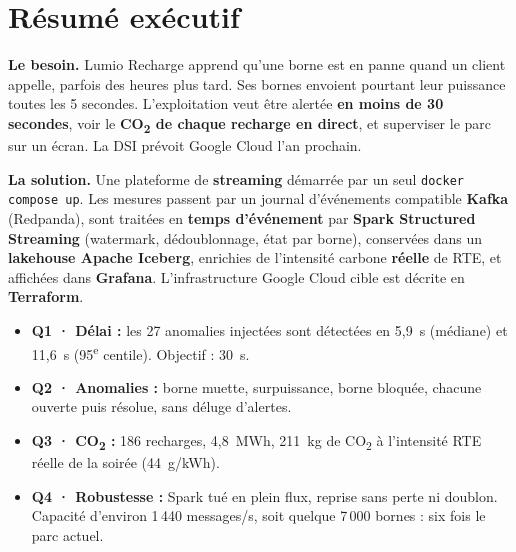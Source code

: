 \documentclass[11pt, a4paper, oneside, headings=normal, numbers=noenddot, DIV=12]{scrartcl}
\begin{document}
\begingroup
{}
\setcounter{tocdepth}{2}
\tableofcontents
\endgroup
\clearpage

\section{Résumé exécutif}\label{sec:resume}

\textbf{Le besoin.} Lumio Recharge apprend qu'une borne est en panne quand un client appelle, parfois des heures plus tard. Ses bornes envoient
pourtant leur puissance toutes les 5 secondes. L'exploitation veut être alertée \textbf{en moins de 30 secondes}, voir le \textbf{CO\textsubscript{2}
de chaque recharge en direct}, et superviser le parc sur un écran. La DSI prévoit Google Cloud l'an prochain.

\textbf{La solution.} Une plateforme de \textbf{streaming} démarrée par un seul \texttt{docker compose up}. Les mesures passent par un journal
d'événements compatible \textbf{Kafka} (Redpanda), sont traitées en \textbf{temps d'événement} par \textbf{Spark Structured Streaming}
(watermark, dédoublonnage, état par borne), conservées dans un \textbf{lakehouse Apache Iceberg}, enrichies de l'intensité carbone
\textbf{réelle} de RTE, et affichées dans \textbf{Grafana}. L'infrastructure Google Cloud cible est décrite en \textbf{Terraform}.


\begin{keybox}
\begin{itemize}[leftmargin=1.2em]
  \item \textbf{Q1 · Délai :} les 27 anomalies injectées sont détectées en 5,9~s (médiane) et 11,6~s (95\textsuperscript{e} centile). Objectif : 30~s.
  \item \textbf{Q2 · Anomalies :} borne muette, surpuissance, borne bloquée, chacune ouverte puis résolue, sans déluge d'alertes.
  \item \textbf{Q3 · CO\textsubscript{2} :} 186 recharges, 4,8~MWh, 211~kg de CO\textsubscript{2} à l'intensité RTE réelle de la soirée (44~g/kWh).
  \item \textbf{Q4 · Robustesse :} Spark tué en plein flux, reprise sans perte ni doublon. Capacité d'environ 1\,440 messages/s, soit
        quelque 7\,000 bornes : six fois le parc actuel.
\end{itemize}
\end{keybox}
\end{document}

